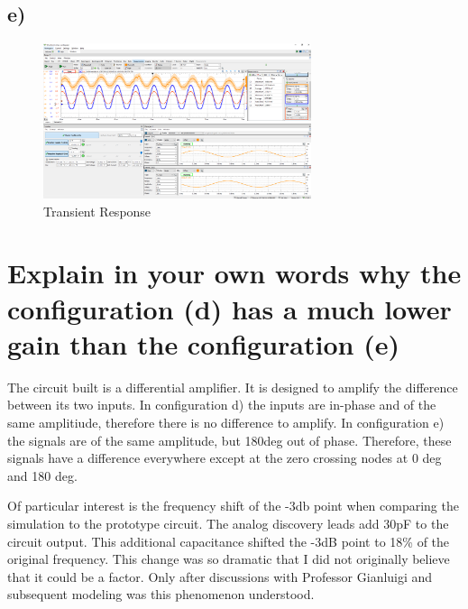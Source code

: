\documentclass{article}
\begin{document}
	\subsection*{e)}

	\begin{figure}[H]
	    \centering
	    \includegraphics[width=0.7\textwidth]{w1e-1}
	    \caption{Transient Response}
	\end{figure}
	
	
	\section{Explain in your own words why the configuration (d) has a much lower gain than the configuration (e)}
	
	The circuit built is a differential amplifier. It is designed to amplify the difference between its two inputs. In configuration d) the inputs are in-phase and of the same amplitiude, therefore there is no difference to amplify. In configuration e) the signals are of the same amplitude, but 180deg out of phase. Therefore, these signals have a difference everywhere except at the zero crossing nodes at 0 deg and 180 deg. 
	
	Of particular interest is the frequency shift of the -3db point when comparing the simulation to the prototype circuit. The analog discovery leads add 30pF to the circuit output. This additional capacitance shifted the -3dB point to 18\% of the original frequency. This change was so dramatic that I did not originally believe that it could be a factor. Only after discussions with Professor Gianluigi and subsequent modeling was this phenomenon understood. 
	
		
\end{document}
